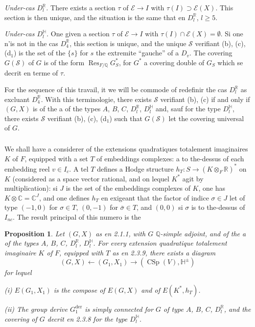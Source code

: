 \documentclass[12pt,a4paper]{article}
\theoremstyle{plain}
\newtheorem{proposition}[theorem]{Proposition}
\theoremstyle{definition}
\theoremstyle{remark}
\DeclareMathOperator{\CSp}{CSp}
\DeclareMathOperator{\Res}{Res}
\newcommand{\QQ}{\mathbb{Q}}
\newcommand{\RR}{\mathbb{R}}
\newcommand{\CC}{\mathbb{C}}
\newcommand{\HH}{\mathbb{H}}
\begin{document}
\textit{Under-cas $D_l^{\RR}$.} There exists a section $\tau$ of $\mathcal{E} \to I$ with $\tau(I) \supset \mathcal{E}(X)$. This section is then unique, and the situation is the same that en $D_l^{\RR}$, $l \ge 5$.

\textit{Under-cas $D_l^{\mathbb{H}}$.} One given a section $\tau$ of $\mathcal{E} \to I$ with $\tau(I) \cap \mathcal{E}(X) = \emptyset$. Si one n'is not in the cas $D_4^{\RR}$, this section is unique, and the unique $\mathcal{S}$ verifiant (b), (c), (d$_1$) is the set of the $\{s\}$ for $s$ the extremite ``gauche'' of a $D_v$. The covering $G(\mathcal{S})$ of $G$ is of the form $\Res_{F/\QQ} G^*_S$, for $G^*$ a covering double of $G_S$ which se decrit en terme of $\tau$.

For the sequence of this travail, it we will be commode of redefinir the cas $D_l^{\RR}$ as excluant $D_4^{\RR}$. With this terminologie, there exists $\mathcal{S}$ verifiant (b), (c) if and only if $(G,X)$ is of the a of the types $A$, $B$, $C$, $D_l^{\RR}$, $D_l^{\mathbb{H}}$ and, sauf for the type $D_l^{\mathbb{H}}$, there exists $\mathcal{S}$ verifiant (b), (c), (d$_1$) such that $G(\mathcal{S})$ let the covering universal of $G$.

\subsubsection{}

We shall have a considerer of the extensions quadratiques totalement imaginaires $K$ of $F$, equipped with a set $T$ of embeddings complexes: a to the-dessus of each embedding reel $v \in I_c$. A tel $T$ defines a Hodge structure $h_T:S \to (K \otimes_F \RR)^*$ on $K$ (considered as a space vector rational, and on lequel $K^*$ agit by multiplication): si $J$ is the set of the embeddings complexes of $K$, one has $K \otimes \CC = \CC^J$, and one defines $h_T$ en exigeant that the factor of indice $\sigma \in J$ let of type $(-1,0)$ for $\sigma \in T$, $(0,-1)$ for $\bar{\sigma} \in T$, and $(0,0)$ si $\sigma$ is to the-dessus of $I_{nc}$. The result principal of this numero is the

\begin{proposition}
Let $(G,X)$ as en 2.1.1, with $G$ $\QQ$-simple adjoint, and of the a of the types $A$, $B$, $C$, $D_l^{\RR}$, $D_l^{\mathbb{H}}$. For every extension quadratique totalement imaginaire $K$ of $F$, equipped with $T$ as en 2.3.9, there exists a diagram
\[
(G,X) \longleftarrow (G_1,X_1) \longrightarrow (\CSp(V),\HH^{\pm})
\]
for lequel

\textup{(i)} $E(G_1,X_1)$ is the compose of $E(G,X)$ and of $E(K^*,h_T)$.

\textup{(ii)} The group derive $G_1^{\text{der}}$ is simply connected for $G$ of type $A$, $B$, $C$, $D_l^{\RR}$, and the covering of $G$ decrit en 2.3.8 for the type $D_l^{\mathbb{H}}$.
\end{proposition}
\end{document}
